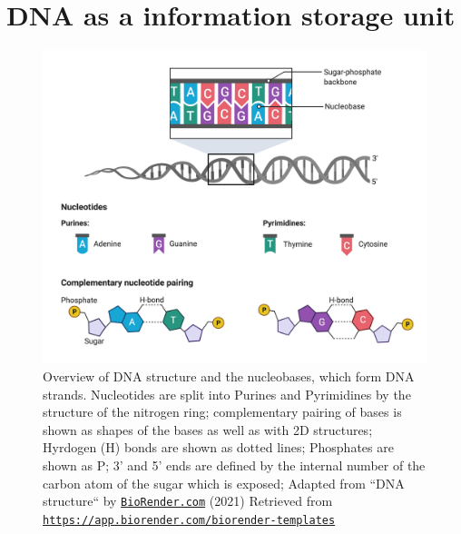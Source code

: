\section[DNA]{DNA as a information storage unit}
\label{intro-sec:DNA}

\begin{figure}[!ht]
\centering
\includegraphics[width=0.9\linewidth]{Figures/DNAStructure.png}
\caption[Overview DNA structure]{Overview of DNA structure and the nucleobases, which form DNA strands. Nucleotides are split into Purines and Pyrimidines by the structure of the nitrogen ring; complementary pairing of bases is shown as shapes of the bases as well as with 2D structures; Hyrdogen (H) bonds are shown as dotted lines; Phosphates are shown as P; 3' and 5' ends are defined by the internal number of the carbon atom of the sugar which is exposed; Adapted from ``DNA structure`` by \href{https://biorender.com}{\nolinkurl{BioRender.com}} (2021) Retrieved from \href{https://app.biorender.com/biorender-templates}{\nolinkurl{https://app.biorender.com/biorender-templates}}}\label{fig:DNAstructure}
\end{figure}


